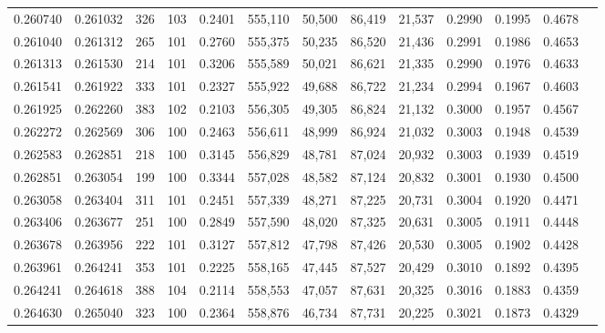 \begin{tabular}{rrrrrrrrrrrrr}
0.260740 & 0.261032 &   326 & 103 &                                     0.2401 & 555,110 &  50,500 &  86,419 &  21,537 & 0.2990 & 0.1995 & 0.4678 \\
0.261040 & 0.261312 &   265 & 101 &                                     0.2760 & 555,375 &  50,235 &  86,520 &  21,436 & 0.2991 & 0.1986 & 0.4653 \\
0.261313 & 0.261530 &   214 & 101 &                                     0.3206 & 555,589 &  50,021 &  86,621 &  21,335 & 0.2990 & 0.1976 & 0.4633 \\
0.261541 & 0.261922 &   333 & 101 &                                     0.2327 & 555,922 &  49,688 &  86,722 &  21,234 & 0.2994 & 0.1967 & 0.4603 \\
0.261925 & 0.262260 &   383 & 102 &                                     0.2103 & 556,305 &  49,305 &  86,824 &  21,132 & 0.3000 & 0.1957 & 0.4567 \\
0.262272 & 0.262569 &   306 & 100 &                                     0.2463 & 556,611 &  48,999 &  86,924 &  21,032 & 0.3003 & 0.1948 & 0.4539 \\
0.262583 & 0.262851 &   218 & 100 &                                     0.3145 & 556,829 &  48,781 &  87,024 &  20,932 & 0.3003 & 0.1939 & 0.4519 \\
0.262851 & 0.263054 &   199 & 100 &                                     0.3344 & 557,028 &  48,582 &  87,124 &  20,832 & 0.3001 & 0.1930 & 0.4500 \\
0.263058 & 0.263404 &   311 & 101 &                                     0.2451 & 557,339 &  48,271 &  87,225 &  20,731 & 0.3004 & 0.1920 & 0.4471 \\
0.263406 & 0.263677 &   251 & 100 &                                     0.2849 & 557,590 &  48,020 &  87,325 &  20,631 & 0.3005 & 0.1911 & 0.4448 \\
0.263678 & 0.263956 &   222 & 101 &                                     0.3127 & 557,812 &  47,798 &  87,426 &  20,530 & 0.3005 & 0.1902 & 0.4428 \\
0.263961 & 0.264241 &   353 & 101 &                                     0.2225 & 558,165 &  47,445 &  87,527 &  20,429 & 0.3010 & 0.1892 & 0.4395 \\
0.264241 & 0.264618 &   388 & 104 &                                     0.2114 & 558,553 &  47,057 &  87,631 &  20,325 & 0.3016 & 0.1883 & 0.4359 \\
0.264630 & 0.265040 &   323 & 100 &                                     0.2364 & 558,876 &  46,734 &  87,731 &  20,225 & 0.3021 & 0.1873 & 0.4329 \\

\end{tabular}
